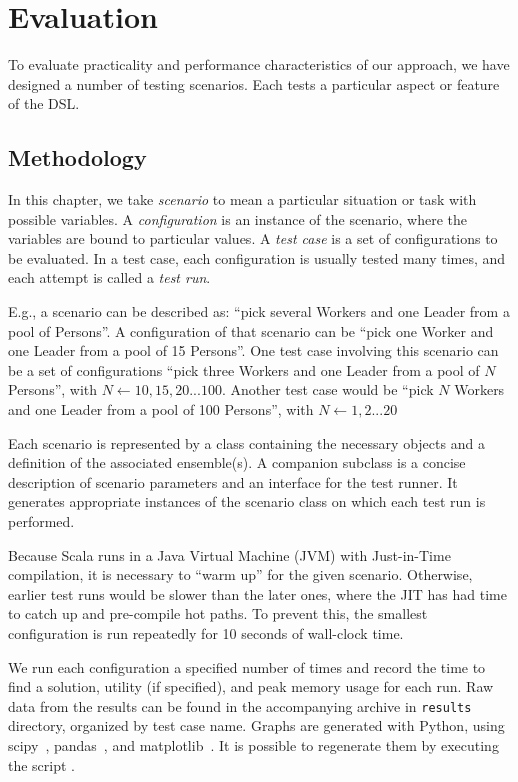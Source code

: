 \chapter{Evaluation}
\label{evaluation}

To evaluate practicality and performance characteristics of our approach, we have
designed a number of testing scenarios. Each tests a particular aspect or feature of the
DSL.

\section{Methodology}

In this chapter, we take \textit{scenario} to mean a particular situation or task with
possible variables. A \textit{configuration} is an instance of the scenario, where the
variables are bound to particular values. A \textit{test case} is a set of
configurations to be evaluated. In a test case, each configuration is usually tested
many times, and each attempt is called a \textit{test run}.

E.g., a scenario can be described as: ``pick several Workers and one Leader from a pool
of Persons''. A configuration of that scenario can be ``pick one Worker and one Leader
from a pool of 15 Persons''. One test case involving this scenario can be a set of
configurations ``pick three Workers and one Leader from a pool of $N$ Persons'', with $N
\leftarrow 10, 15, 20... 100$. Another test case would be ``pick $N$ Workers and one
Leader from a pool of 100 Persons'', with $N \leftarrow 1, 2... 20$

Each scenario is represented by a class containing the necessary objects and a
definition of the associated ensemble(s). A companion  subclass is a concise
description of scenario parameters and an interface for the test runner. It generates
appropriate instances of the scenario class on which each test run is performed.

Because Scala runs in a Java Virtual Machine (JVM) with Just-in-Time compilation, it is
necessary to ``warm up'' for the given scenario. Otherwise, earlier test runs would be
slower than the later ones, where the JIT has had time to catch up and pre-compile hot
paths. To prevent this, the smallest configuration is run repeatedly for 10 seconds of
wall-clock time.

We run each configuration a specified number of times and record the time to find a
solution, utility (if specified), and peak memory usage for each run. Raw data from the
results can be found in the accompanying archive in \texttt{results} directory,
organized by test case name. Graphs are generated with Python, using
scipy~\citep{scipy}, pandas~\citep{pandas}, and matplotlib~\citep{matplotlib}. It is
possible to regenerate them by executing the script .

